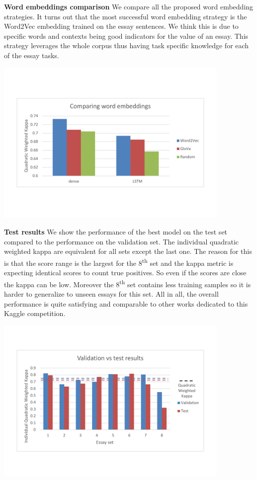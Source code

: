 \documentclass[a4paper,12pt,english]{article}
\begin{document}
\textbf{Word embeddings comparison} We compare all the proposed word embedding strategies. It turns out that the most successful word embedding strategy is the Word2Vec embedding trained on the essay sentences. We think this is due to specific words and contexts being good indicators for the value of an essay. This strategy leverages the whole corpus thus having task specific knowledge for each of the essay tasks.

\begin{center}
\vspace*{-1.5cm}
\includegraphics[width=0.85\textwidth]{fig/word_embeddings.pdf}
\vspace*{-1.5cm}
\end{center}

\textbf{Test results} We show the performance of the best model on the test set compared to the performance on the validation set. The individual quadratic weighted kappa are equivalent for all sets except the last one. The reason for this is that the score range is the largest for the 8\textsuperscript{th} set and the kappa metric is expecting identical scores to count true positives. So even if the scores are close the kappa can be low. Moreover the 8\textsuperscript{th} set contains less training samples so it is harder to generalize to unseen essays for this set. All in all, the overall performance is quite satisfying and comparable to other works dedicated to this Kaggle competition.

\begin{center}
\vspace*{-1.5cm}
\includegraphics[width=0.85\textwidth]{fig/test.pdf}
\vspace*{-1.5cm}
\end{center}
\end{document}
